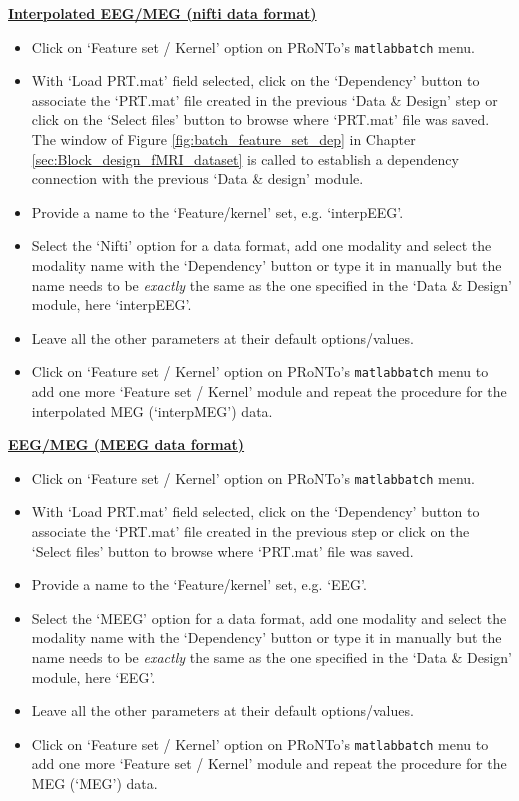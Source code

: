 \textbf{\underline{Interpolated EEG/MEG (nifti data format)}}
\begin{itemize}
	\item Click on `Feature set / Kernel' option on PRoNTo's {\tt matlabbatch} menu.
	
	\item With `Load PRT.mat' field selected, click on the `Dependency' button to associate the `PRT.mat' file created in the previous `Data \& Design' step or click on the `Select files' button to browse where `PRT.mat' file was saved. The window of Figure \ref{fig:batch_feature_set_dep} in Chapter \ref{sec:Block_design_fMRI_dataset} is called to establish a dependency connection with the previous `Data \& design' module.

	\item Provide a name to the `Feature/kernel' set, e.g. `interpEEG'.
	
	\item Select the `Nifti' option for a data format, add one modality and select the modality name with the `Dependency' button or type it in manually but the name needs to be {\it exactly} the same as the one specified in the `Data \& Design' module, here `interpEEG'.
	
	\item Leave all the other parameters at their default options/values.
	
	\item Click on `Feature set / Kernel' option on PRoNTo's {\tt matlabbatch} menu to add one more `Feature set / Kernel' module and repeat the procedure for the interpolated MEG (`interpMEG') data.
	
	\end{itemize}	

	
\noindent \textbf{\underline{EEG/MEG (MEEG data format)}}
\begin{itemize}
    \item Click on `Feature set / Kernel' option on PRoNTo's {\tt matlabbatch} menu.
	
	\item With `Load PRT.mat' field selected, click on the `Dependency' button to associate the `PRT.mat' file created in the previous step or click on the `Select files' button to browse where `PRT.mat' file was saved.

	\item Provide a name to the `Feature/kernel' set, e.g. `EEG'.
	
	\item Select the `MEEG' option for a data format, add one modality and select the modality name with the `Dependency' button or type it in manually but the name needs to be {\it exactly} the same as the one specified in the `Data \& Design' module, here `EEG'.
	
	\item Leave all the other parameters at their default options/values.
	
	\item Click on `Feature set / Kernel' option on PRoNTo's {\tt matlabbatch} menu to add one more `Feature set / Kernel' module and repeat the procedure for the MEG (`MEG') data.

	\end{itemize}
	

